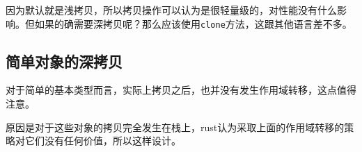 \documentclass[12pt]{article}
\begin{document}
因为默认就是浅拷贝，所以拷贝操作可以认为是很轻量级的，对性能没有什么影响。但如果的确需要深拷贝呢？那么应该使用\texttt{clone}方法，这跟其他语言差不多。

\begin{Shaded}
\begin{Highlighting}[]
\OperatorTok{=} \PreprocessorTok{::}\NormalTok{)}\OperatorTok{;}
\OperatorTok{=}\OperatorTok{;}            
\NormalTok{(}\OperatorTok{,}\OperatorTok{,}\OperatorTok{;}     
\end{Highlighting}
\end{Shaded}

\subsection{简单对象的深拷贝}\label{ux7b80ux5355ux5bf9ux8c61ux7684ux6df1ux62f7ux8d1d}

对于简单的基本类型而言，实际上拷贝之后，也并没有发生作用域转移，这点值得注意。

\begin{Shaded}
\begin{Highlighting}[]
\OperatorTok{=} \OperatorTok{;}
\OperatorTok{=}\OperatorTok{;}                   
\NormalTok{(}\OperatorTok{,}\OperatorTok{,}\OperatorTok{;}

\OperatorTok{=} \PreprocessorTok{::}\NormalTok{)}\OperatorTok{;}
\OperatorTok{=}\OperatorTok{;}
\NormalTok{(}\OperatorTok{,}\OperatorTok{,}\OperatorTok{;} 
\end{Highlighting}
\end{Shaded}

原因是对于这些对象的拷贝完全发生在栈上，rust认为采取上面的作用域转移的策略对它们没有任何价值，所以这样设计。
\end{document}
